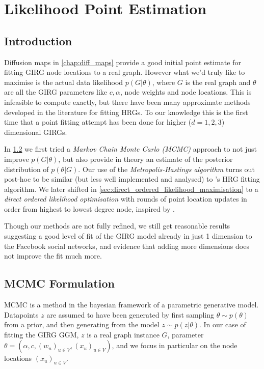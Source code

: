 \chapter{Likelihood Point Estimation}
\label{chap:likelihood_point_estimation}
\minitoc
\section{Introduction}
Diffusion maps in \cref{chap:diff_maps} provide a good initial point estimate for fitting GIRG node locations to a real graph. However what we'd truly like to maximise is the actual data likelihood $p(G | \theta)$, where $G$ is the real graph and $\theta$ are all the GIRG parameters like $c, \alpha$, node weights and node locations. This is infeasible to compute exactly, but there have been many approximate methods developed in the literature for fitting HRGs. To our knowledge this is the first time that a point fitting attempt has been done for higher ($d=1,2,3$) dimensional GIRGs.




In \cref{sec:mcmc_formulation} we first tried a \textit{Markov Chain Monte Carlo (MCMC)} approach to not just improve $p(G | \theta)$, but also provide in theory an estimate of the posterior distribution of $p(\theta | G)$. Our use of the \textit{Metropolis-Hastings algorithm} turns out post-hoc to be similar (but less well implemented and analysed) to \cite{boguna2010sustaining}'s HRG fitting algorithm. We later shifted in \cref{sec:direct_ordered_likelihood_maximisation} to a \textit{direct ordered likelihood optimisation} with rounds of point location updates in order from highest to lowest degree node, inspired by \cite{garcia2019mercator}.


Though our methods are not fully refined, we still get reasonable results suggesting a good level of fit of the GIRG model already in just 1 dimension to the Facebook social networks, and evidence that adding more dimensions does not improve the fit much more.

\section{MCMC Formulation}
\label{sec:mcmc_formulation}
MCMC is a method in the bayesian framework of a parametric generative model. Datapoints $z$ are assumed to have been generated by first sampling $\theta \sim p(\theta)$ from a prior, and then generating from the model $z \sim p(z | \theta)$. In our case of fitting the GIRG GGM, $z$ is a real graph instance $G$, parameter $\theta = (\alpha, c, (w_u)_{u \in V}, (x_u)_{u \in V})$, and we focus in particular on the node locations $(x_u)_{u \in V}$.

